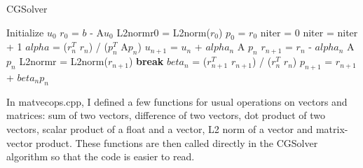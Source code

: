 \documentclass[a4paper,11pt]{article}
\begin{document}
 
\begin{algorithm}
	\caption{CGSolver} 
	\begin{algorithmic}[1]
            \State Initialize $u_{0}$
            \State $r_{0}$ = $b$ - A$u_{0}$
            \State L2normr0 = L2norm($r_{0}$)
            \State $p_{0}$ = $r_{0}$
            \State niter = 0
                    \State niter = niter + 1
                    \State $alpha$ = ($r_{n}^{T}$ $r_{n}$) / ($p_{n}^{T}$ A$p_{n}$)
                    \State $u_{n+1}$ = $u_{n}$ + $alpha_{n}$ A $p_{n}$
                    \State $r_{n+1}$ = $r_{n}$ - $alpha_{n}$ A $p_{n}$
                    \State L2normr = L2norm($r_{n+1}$)
                            \State \textbf{break}
                            \EndIf
                    \State $beta_{n}$ = ($r_{n+1}^{T}$ $r_{n+1}$) / ($r_{n}^{T}$ $r_{n}$)
                    \State $p_{n+1}$ = $r_{n+1}$ + $beta_{n} p_{n}$
                     
	\end{algorithmic} 
\end{algorithm} 

  In matvecops.cpp, I defined a few functions for usual operations on vectors and matrices: sum of two vectors, difference of two vectors, dot product of two vectors, scalar product of a float and a vector, L2 norm of a vector and matrix-vector product. 
    These functions are then called directly in the CGSolver algorithm so that the code is easier to read.  
\end{document}
